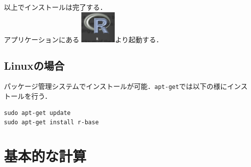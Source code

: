 \documentclass[a4paper,10pt,fleqn]{jarticle}
\begin{document}
以上でインストールは完了する．\\

アプリケーションにある \includegraphics[width=1.8cm]{img/osx/osx012.eps}より起動する．
\subsection{Linuxの場合}
パッケージ管理システムでインストールが可能．\verb+apt-get+では以下の様にインストールを行う．
\begin{breakbox}
\begin{verbatim}
sudo apt-get update
sudo apt-get install r-base
\end{verbatim}
\end{breakbox}
\newpage
\section{基本的な計算}
\end{document}
